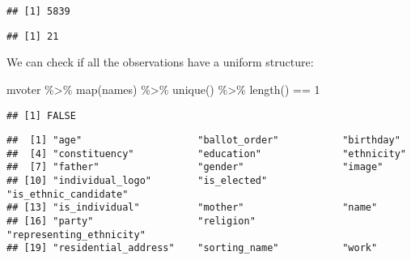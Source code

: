 \documentclass[
]{article}
\newenvironment{Shaded}{\begin{snugshade}}{\end{snugshade}}
\newcommand{\DecValTok}[1]{\textcolor[rgb]{0.00,0.00,0.81}{#1}}
\newcommand{\FunctionTok}[1]{\textcolor[rgb]{0.00,0.00,0.00}{#1}}
\newcommand{\NormalTok}[1]{#1}
\newcommand{\OtherTok}[1]{\textcolor[rgb]{0.56,0.35,0.01}{#1}}
\newcommand{\SpecialCharTok}[1]{\textcolor[rgb]{0.00,0.00,0.00}{#1}}
\begin{document}
\begin{verbatim}
## [1] 5839
\end{verbatim}

\begin{Shaded}
\end{Shaded}

\begin{verbatim}
## [1] 21
\end{verbatim}

We can check if all the observations have a uniform structure:

\begin{Shaded}
\begin{Highlighting}[]
\NormalTok{mvoter }\SpecialCharTok{\%\textgreater{}\%}
  \FunctionTok{map}\NormalTok{(names) }\SpecialCharTok{\%\textgreater{}\%}
  \FunctionTok{unique}\NormalTok{() }\SpecialCharTok{\%\textgreater{}\%}
  \FunctionTok{length}\NormalTok{() }\SpecialCharTok{==} \DecValTok{1}
\end{Highlighting}
\end{Shaded}

\begin{verbatim}
## [1] FALSE
\end{verbatim}

\begin{Shaded}
\end{Shaded}

\begin{verbatim}
##  [1] "age"                    "ballot_order"           "birthday"              
##  [4] "constituency"           "education"              "ethnicity"             
##  [7] "father"                 "gender"                 "image"                 
## [10] "individual_logo"        "is_elected"             "is_ethnic_candidate"   
## [13] "is_individual"          "mother"                 "name"                  
## [16] "party"                  "religion"               "representing_ethnicity"
## [19] "residential_address"    "sorting_name"           "work"
\end{verbatim}
\end{document}
